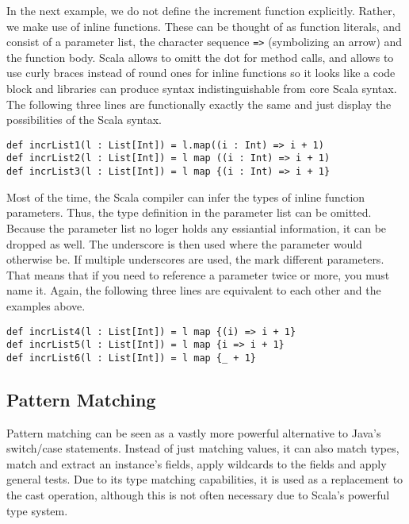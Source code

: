 In the next example, we do not define the increment function explicitly. Rather, we make use of inline functions. These can be thought of as function literals, and consist of a parameter list, the character sequence \lstinline!=>! (symbolizing an arrow) and the function body. Scala allows to omitt the dot for method calls, and allows to use curly braces instead of round ones for inline functions so it looks like a code block and libraries can produce syntax indistinguishable from core Scala syntax. The following three lines are functionally exactly the same and just display the possibilities of the Scala syntax.

\begin{lstlisting}[caption=Scala Inline Functions,label=lst:scala:functions2]
def incrList1(l : List[Int]) = l.map((i : Int) => i + 1)
def incrList2(l : List[Int]) = l map ((i : Int) => i + 1)
def incrList3(l : List[Int]) = l map {(i : Int) => i + 1}
\end{lstlisting}

Most of the time, the Scala compiler can infer the types of inline function parameters. Thus, the type definition in the parameter list can be omitted. Because the parameter list no loger holds any essiantial information, it can be dropped as well. The underscore is then used where the parameter would otherwise be. If multiple underscores are used, the mark different parameters. That means that if you need to reference a parameter twice or more, you must name it. Again, the following three lines are equivalent to each other and the examples above.

\begin{lstlisting}[caption=Dropping the Parameter List,label=lst:scala:functions3]
def incrList4(l : List[Int]) = l map {(i) => i + 1}
def incrList5(l : List[Int]) = l map {i => i + 1}
def incrList6(l : List[Int]) = l map {_ + 1}
\end{lstlisting}


\subsection{Pattern Matching}

Pattern matching can be seen as a vastly more powerful alternative to Java's switch/case statements. Instead of just matching values, it can also match types, match and extract an instance's fields, apply wildcards to the fields and apply general tests. Due to its type matching capabilities, it is used as a replacement to the cast operation, although this is not often necessary due to Scala's powerful type system.


